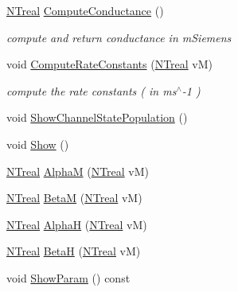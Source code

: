 \begin{DoxyCompactItemize}
\hyperlink{nt__types_8h_a814a97893e9deb1eedcc7604529ba80d}{NTreal} \hyperlink{class_n_t_b_p__multi__sodium__current__o_a5159531b18267e6bc91097dec37f5d4e}{ComputeConductance} ()
\begin{DoxyCompactList}\small\item\em compute and return conductance in mSiemens \item\end{DoxyCompactList}\item 
void \hyperlink{class_n_t_b_p__multi__sodium__current__o_a197c27a0410a8fda170e2b6756f23e10}{ComputeRateConstants} (\hyperlink{nt__types_8h_a814a97893e9deb1eedcc7604529ba80d}{NTreal} vM)
\begin{DoxyCompactList}\small\item\em compute the rate constants ( in ms$^\wedge$-\/1 ) \item\end{DoxyCompactList}\item 
void \hyperlink{class_n_t_b_p__multi__sodium__current__o_a60355872b6488960de8703a11e6ed88b}{ShowChannelStatePopulation} ()
\item 
void \hyperlink{class_n_t_b_p__multi__sodium__current__o_a6d6ce3748522123ce19cc0d1f8812aaf}{Show} ()
\item 
\hyperlink{nt__types_8h_a814a97893e9deb1eedcc7604529ba80d}{NTreal} \hyperlink{class_n_t_b_p__multi__sodium__current__o_a52d6b707753b5061b3abeab6539ff210}{AlphaM} (\hyperlink{nt__types_8h_a814a97893e9deb1eedcc7604529ba80d}{NTreal} vM)
\item 
\hyperlink{nt__types_8h_a814a97893e9deb1eedcc7604529ba80d}{NTreal} \hyperlink{class_n_t_b_p__multi__sodium__current__o_afa94f7edf7469acbcc1113d250ed9b12}{BetaM} (\hyperlink{nt__types_8h_a814a97893e9deb1eedcc7604529ba80d}{NTreal} vM)
\item 
\hyperlink{nt__types_8h_a814a97893e9deb1eedcc7604529ba80d}{NTreal} \hyperlink{class_n_t_b_p__multi__sodium__current__o_a3b8766d44cfa1a30a1d434bbe9719ec0}{AlphaH} (\hyperlink{nt__types_8h_a814a97893e9deb1eedcc7604529ba80d}{NTreal} vM)
\item 
\hyperlink{nt__types_8h_a814a97893e9deb1eedcc7604529ba80d}{NTreal} \hyperlink{class_n_t_b_p__multi__sodium__current__o_a4047a96301a1d8e45dc10619422ef2d3}{BetaH} (\hyperlink{nt__types_8h_a814a97893e9deb1eedcc7604529ba80d}{NTreal} vM)
\item 
void \hyperlink{class_n_t_b_p__multi__sodium__current__o_a0d23a96c4606460539b4b4870eeb856a}{ShowParam} () const 
\end{DoxyCompactItemize}


